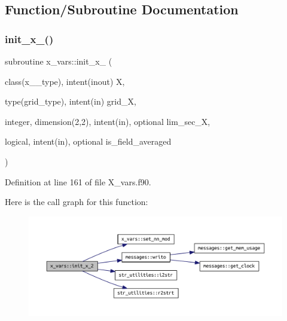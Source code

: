 \subsection{Function/\+Subroutine Documentation}
\mbox{\label{namespacex__vars_a0cf9a4b9bd7874815cf0cbf9bf858918}} 
\subsubsection{\texorpdfstring{init\+\_\+x\+\_()}{init\_x\_2()}}
{\footnotesize\ttfamily subroutine x\+\_\+vars\+::init\+\_\+x\+\_ (\begin{DoxyParamCaption}\item[{class(x\+\_\+2\+\_\+type), intent(inout)}]{X,  }\item[{type(grid\+\_\+type), intent(in)}]{grid\+\_\+X,  }\item[{integer, dimension(2,2), intent(in), optional}]{lim\+\_\+sec\+\_\+X,  }\item[{logical, intent(in), optional}]{is\+\_\+field\+\_\+averaged }\end{DoxyParamCaption})}



Definition at line 161 of file X\+\_\+vars.\+f90.

Here is the call graph for this function\+:
\nopagebreak
\begin{figure}[H]
\begin{center}
\leavevmode
\includegraphics[width=350pt]{namespacex__vars_a0cf9a4b9bd7874815cf0cbf9bf858918_cgraph}
\end{center}
\end{figure}
\mbox{\label{namespacex__vars_a90d744aee4358a8cc35d29304d1bb120}} 
